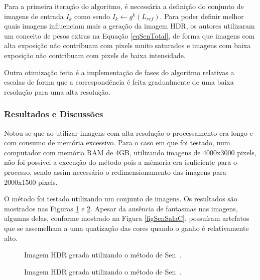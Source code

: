 Para a primeira iteração do algoritmo, é necessária a definição do conjunto de imagens de entrada ${I_k}$ como sendo $I_k \leftarrow g^k(L_{ref})$. Para poder definir melhor quais imagens influenciam mais a geração da imagem HDR, os autores utilizaram um conceito de pesos extras na Equação \ref{eqSenTotal}, de forma que imagens com alta exposição não contribuam com pixels muito saturados e imagens com baixa exposição não contribuam com pixels de baixa intensidade.

Outra otimização feita é a implementação de fases do algoritmo relativas a escalas de forma que a correspondência é feita gradualmente de uma baixa resolução para uma alta resolução.

\subsubsection{Resultados e Discussões} \label{MetodoSenResultado}

Notou-se que ao utilizar imagens com alta resolução o processamento era longo e com consumo de memória excessivo. Para o caso em que foi testado, num computador com memória RAM de 4GB, utilizando imagens de 4000x3000 pixels, não foi possível a execução do método pois a mémoria era isuficiente para o processo, sendo assim necessário o redimensionamento das imagens para 2000x1500 pixels.

O método foi testado utilizando um conjunto de imagens. Os resultados são mostrados nas Figuras \ref{figSenSala} e \ref{figSenPorquinho}. Apesar da ausência de fantasmas nas imagens, algumas delas, conforme mostrado na Figura \ref{figSenSalaC}, possuíram artefatos que se assemelham a uma quatização das cores quando o ganho é relativamente alto.

\begin{figure}[H]
  \centering
  \quad %
  \quad %
  \caption{Imagem HDR gerada utilizando o método de Sen~\etal.}
  \label{figSenSala}
\end{figure}

\begin{figure}[H]
  \centering
  \quad %
  \quad %
  \caption{Imagem HDR gerada utilizando o método de Sen~\etal.}
  \label{figSenPorquinho}
\end{figure}